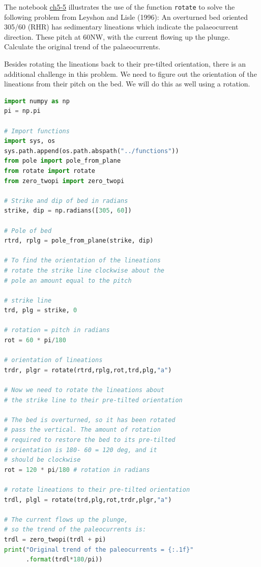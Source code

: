 \documentclass[a4paper , 12pt]{book}
\newcommand{\code}[1]{\colorbox{light-gray}{\texttt{#1}}}
\begin{document}
The  notebook  \href{https://github.com/nfcd/compGeo/blob/master/source/notebooks/ch5-5.ipynb}{ch5-5} illustrates  the  use  of  the  function \code{rotate} to solve the following problem from Leyshon  and Lisle  (1996): An overturned bed oriented 305/60 (RHR) has sedimentary lineations which indicate the palaeocurrent direction. These pitch at 60NW, with the current flowing up the plunge. Calculate the original trend of the palaeocurrents. 

Besides rotating the lineations back to their pre-tilted orientation, there is an additional challenge in this problem. We need to figure out the orientation of the lineations from their pitch on the bed. We will do this as well using a rotation.

\begin{center}
\begin{lstlisting}[language=Python, frame=single]
import numpy as np
pi = np.pi

# Import functions 
import sys, os
sys.path.append(os.path.abspath("../functions"))
from pole import pole_from_plane
from rotate import rotate
from zero_twopi import zero_twopi

# Strike and dip of bed in radians
strike, dip = np.radians([305, 60]) 

# Pole of bed
rtrd, rplg = pole_from_plane(strike, dip)

# To find the orientation of the lineations
# rotate the strike line clockwise about the 
# pole an amount equal to the pitch

# strike line
trd, plg = strike, 0 

# rotation = pitch in radians
rot = 60 * pi/180 

# orientation of lineations
trdr, plgr = rotate(rtrd,rplg,rot,trd,plg,"a")

# Now we need to rotate the lineations about
# the strike line to their pre-tilted orientation

# The bed is overturned, so it has been rotated 
# pass the vertical. The amount of rotation
# required to restore the bed to its pre-tilted
# orientation is 180- 60 = 120 deg, and it
# should be clockwise
rot = 120 * pi/180 # rotation in radians

# rotate lineations to their pre-tilted orientation
trdl, plgl = rotate(trd,plg,rot,trdr,plgr,"a")

# The current flows up the plunge, 
# so the trend of the paleocurrents is:
trdl = zero_twopi(trdl + pi)
print("Original trend of the paleocurrents = {:.1f}"
      .format(trdl*180/pi))
\end{lstlisting}
\end{center}
\end{document}
